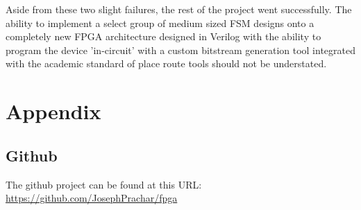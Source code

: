 \documentclass[12pt]{article}
\begin{document}
Aside from these two slight failures, the rest of the project went successfully. The
ability to implement a select group of medium sized FSM designs onto a completely new
FPGA architecture designed in Verilog with the ability to program the device 'in-circuit'
with a custom bitstream generation tool integrated with the academic standard of place
route tools should not be understated.

\newpage
{}


\newpage
\section{Appendix}

\subsection{Github}

The github project can be found at this URL: \url{https://github.com/JosephPrachar/fpga}
\end{document}

